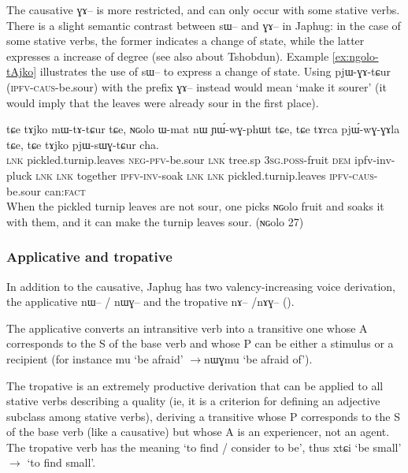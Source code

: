 \documentclass[oldfontcommands,oneside,a4paper,11pt]{article}
\newcommand{\ipa}[1]{{\phon #1}} %
\begin{document}
The causative \ipa{ɣɤ--} is more restricted, and can only occur with some stative verbs. There is a slight semantic contrast between \ipa{sɯ--} and \ipa{ɣɤ--} in Japhug: in the case of some stative verbs, the former indicates a change of state, while the latter expresses a increase of degree (see also \citealt{jackson06paisheng} about Tshobdun). Example \ref{ex:ngolo-tAjko}  illustrates the use of \ipa{sɯ--} to express a change of state. Using \ipa{pjɯ-ɣɤ-tɕur} (\textsc{ipfv-caus}-be.sour) with the prefix \ipa{ɣɤ--} instead would mean `make it sourer' (it would imply that the leaves were already sour in the first place).

 \begin{exe}
\ex \label{ex:ngolo-tAjko}
\gll
\ipa{tɕe} 	\ipa{tɤjko} 	\ipa{mɯ-tɤ-tɕur} 	\ipa{tɕe,} 	\ipa{ɴɢolo} 	\ipa{ɯ-mat} 	\ipa{nɯ} 	\ipa{ɲɯ́-wɣ-phɯt} 	\ipa{tɕe,} 	\ipa{tɕe} 	\ipa{tɤrca} 	\ipa{pjɯ́-wɣ-ɣɤla} 	\ipa{tɕe,} 	\ipa{tɕe} 	\ipa{tɤjko} 	\ipa{pjɯ-sɯɣ-tɕur} 	\ipa{cha.} \\ 
\textsc{lnk} pickled.turnip.leaves \textsc{neg-pfv}-be.sour \textsc{lnk} tree.sp \textsc{3sg.poss}-fruit \textsc{dem} ipfv-inv-pluck \textsc{lnk} \textsc{lnk} together \textsc{ipfv-inv}-soak \textsc{lnk} \textsc{lnk}  pickled.turnip.leaves \textsc{ipfv-caus}-be.sour  can:\textsc{fact} \\
 \glt When the pickled turnip leaves are not sour, one picks \ipa{ɴɢolo} fruit and soaks it with them, and it can make the turnip leaves sour.   (\ipa{ɴɢolo} 27)
   \end{exe}

\subsubsection{Applicative and tropative}
In addition to the causative, Japhug has two valency-increasing voice derivation, the applicative \ipa{nɯ--} / \ipa{nɯɣ--} and the tropative \ipa{nɤ--} /\ipa{nɤɣ--} (\citealt{jacques13tropative}).

The applicative converts an intransitive verb into a transitive one whose A corresponds to the S of the base verb and whose P can be either a stimulus or a recipient (for instance \ipa{mu} `be afraid' $\rightarrow$\ipa{nɯɣmu} `be afraid of'). 

The tropative is an extremely productive derivation that can be applied to all stative verbs describing a quality (ie, it is a criterion for defining an adjective subclass among stative verbs), deriving a transitive whose P corresponds to the S of the base verb (like a causative) but whose A is an experiencer, not an agent. The tropative verb has the meaning `to find / consider to be', thus \ipa{xtɕi} `be small' $\rightarrow$ `to find small'.
\end{document}
